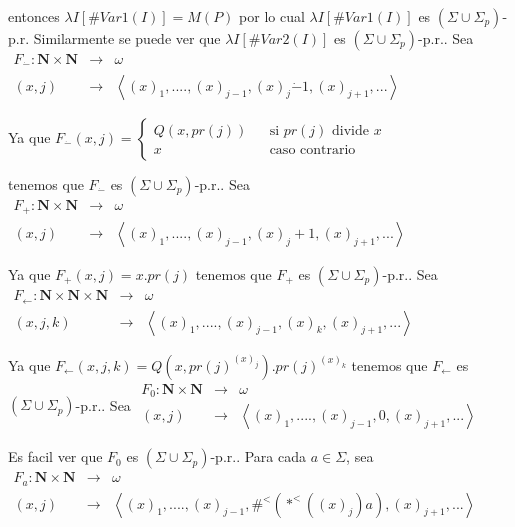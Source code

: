 entonces \(\lambda I[\#Var1(I)]=M(P)\) por lo cual \(\lambda I[\#Var1(I)]\) es \( (\Sigma \cup \Sigma _{p})\)-p.r. Similarmente se puede ver que \(\lambda I[\#Var2(I)]\) es \((\Sigma \cup \Sigma _{p})\)-p.r.. Sea
\(\displaystyle \begin{array}{rll} F_{\dot{-}}:\mathbf{N}\times \mathbf{N} & \rightarrow & \omega \\ (x,j) & \rightarrow & \left\langle (x)_{1},....,(x)_{j-1},(x)_{j}\dot{-} 1,(x)_{j+1},...\right\rangle \end{array} \)

Ya que
\(\displaystyle F_{\dot{-}}(x,j)=\left\{ \begin{array}{lll} Q(x,pr(j)) & & \text{si }pr(j)\text{ divide }x \\ x & & \text{caso contrario} \end{array} \right. \)

tenemos que \(F_{\dot{-}}\) es \((\Sigma \cup \Sigma _{p})\)-p.r.. Sea
\(\displaystyle \begin{array}{rll} F_{+}:\mathbf{N}\times \mathbf{N} & \rightarrow & \omega \\ (x,j) & \rightarrow & \left\langle (x)_{1},....,(x)_{j-1},(x)_{j}+1,(x)_{j+1},...\right\rangle \end{array} \)

Ya que \(F_{+}(x,j)=x.pr(j)\) tenemos que \(F_{+}\) es \((\Sigma \cup \Sigma _{p}) \)-p.r.. Sea
\(\displaystyle \begin{array}{rll} F_{\leftarrow }:\mathbf{N}\times \mathbf{N}\times \mathbf{N} & \rightarrow & \omega \\ (x,j,k) & \rightarrow & \left\langle (x)_{1},....,(x)_{j-1},(x)_{k},(x)_{j+1},...\right\rangle \end{array} \)

Ya que \(F_{\leftarrow }(x,j,k)=Q(x,pr(j)^{(x)_{j}}).pr(j)^{(x)_{k}}\) tenemos que \(F_{\leftarrow }\) es \((\Sigma \cup \Sigma _{p})\)-p.r.. Sea
\(\displaystyle \begin{array}{rll} F_{0}:\mathbf{N}\times \mathbf{N} & \rightarrow & \omega \\ (x,j) & \rightarrow & \left\langle (x)_{1},....,(x)_{j-1},0,(x)_{j+1},...\right\rangle \end{array} \)

Es facil ver que \(F_{0}\) es \((\Sigma \cup \Sigma _{p})\)-p.r.. Para cada \( a\in \Sigma \), sea
\(\displaystyle \begin{array}{rll} F_{a}:\mathbf{N}\times \mathbf{N} & \rightarrow & \omega \\ (x,j) & \rightarrow & \left\langle (x)_{1},....,(x)_{j-1},\#^{< }(\ast ^{< }((x)_{j})a),(x)_{j+1},...\right\rangle \end{array} \)

